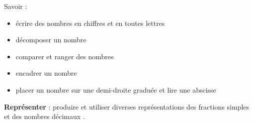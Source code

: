 \begin{myobj}
	Savoir :
	\begin{itemize}
		
		\item  écrire des nombres en chiffres et en toutes lettres
		\item décomposer un nombre
		\item comparer et ranger des nombres
		\item  encadrer un nombre 
		\item placer un nombre sur une demi-droite graduée et lire une abscisse
	\end{itemize}
\end{myobj}

\begin{mycomp}
	\textbf{Représenter} :
	produire et utiliser diverses représentations des fractions simples et des nombres décimaux .
	
\end{mycomp}


